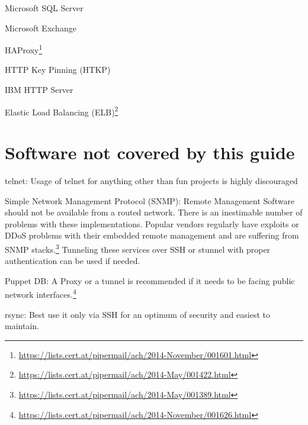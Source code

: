 \begin{multicols}{3}
\begin{itemize*}
  \item Microsoft SQL Server
  \item Microsoft Exchange
  \item HAProxy\footnote{\url{https://lists.cert.at/pipermail/ach/2014-November/001601.html}}
  \item HTTP Key Pinning (HTKP)
  \item IBM HTTP Server
  \item Elastic Load Balancing (ELB)\footnote{\url{https://lists.cert.at/pipermail/ach/2014-May/001422.html}}
\end{itemize*}
\end{multicols}

\section{Software not covered by this guide}
\label{sec:uncovered}

\begin{itemize*}
  \item telnet: Usage of telnet for anything other than fun projects is highly discouraged
  \item Simple Network Management Protocol (SNMP): Remote Management Software should not be available from a routed network. There is an inestimable number of problems with these implementations. Popular vendors regularly have exploits or DDoS problems with their embedded remote management and are suffering from SNMP stacks.\footnote{\url{https://lists.cert.at/pipermail/ach/2014-May/001389.html}} Tunneling these services over SSH or stunnel with proper authentication can be used if needed.
  \item Puppet DB: A Proxy or a tunnel is recommended if it needs to be facing public network interfaces.\footnote{\url{https://lists.cert.at/pipermail/ach/2014-November/001626.html}}
  \item rsync: Best use it only via SSH for an optimum of security and easiest to maintain.
\end{itemize*}

